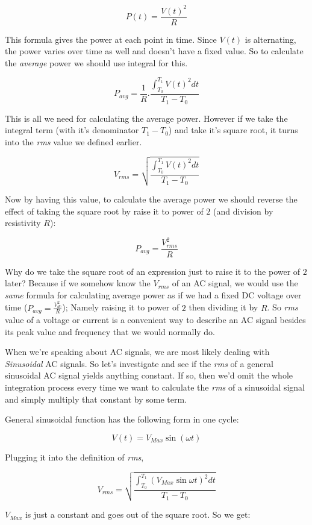 \documentclass{article}
\begin{document}
	$$P(t) = \frac{V(t)^2}{R}$$
	
	This formula gives the power at each point in time. Since $V(t)$ is alternating, the power varies over time as well and doesn't have a fixed value. So to calculate the \textit{average} power we should use integral for this.
	
	$$P_{avg} = \frac{1}{R}.\frac{\int_{T_0}^{T_1} V(t)^2 dt }{T_1 - T_0}$$
	
	This is all we need for calculating the average power. However if we take the integral term (with it's denominator $T_1 - T_0$) and take it's square root, it turns into the \textit{rms} value we defined earlier.
	
	$$V_{rms} = \sqrt{\frac{\int_{T_0}^{T_1} V(t)^2 dt }{T_1 - T_0}} $$
	
	Now by having this value, to calculate the average power we should reverse the effect of taking the square root by raise it to power of $2$ (and division by resistivity $R$):
	
	$$ P_{avg} = \frac{V^2_{rms}}{R} $$
	
	Why do we take the square root of an expression just to raise it to the power of $2$ later? Because if we somehow know the $V_{rms}$ of an AC signal, we would use the \textit{same} formula for calculating average power as if we had a fixed DC voltage over time ($P_{avg} = \frac{V^2_{dc}}{R}$); Namely raising it to power of $2$ then dividing it by $R$. So \textit{rms} value of a voltage or current is a convenient way to describe an AC signal besides its peak value and frequency that we would normally do.
	
	When we're speaking about AC signals, we are most likely dealing with \textit{Sinusoidal} AC signals. So let's investigate and see if the \textit{rms} of a general sinusoidal AC signal yields anything constant. If so, then we'd omit the whole integration process every time we want to calculate the \textit{rms} of a sinusoidal signal and simply multiply that constant by some term. \textsl{}
	
	General sinusoidal function has the following form in one cycle:
	
	$$ V(t) = V_{Max} \sin(\omega t) $$
	
	Plugging it into the definition of \textit{rms},
	
	$$V_{rms} = \sqrt{\frac{\int_{T_0}^{T_1} (V_{Max} \sin \omega t) ^ 2 dt} {T_1 - T_0}}$$
	
	$V_{Max}$ is just a constant and goes out of the square root. So we get:
	
\end{document}
